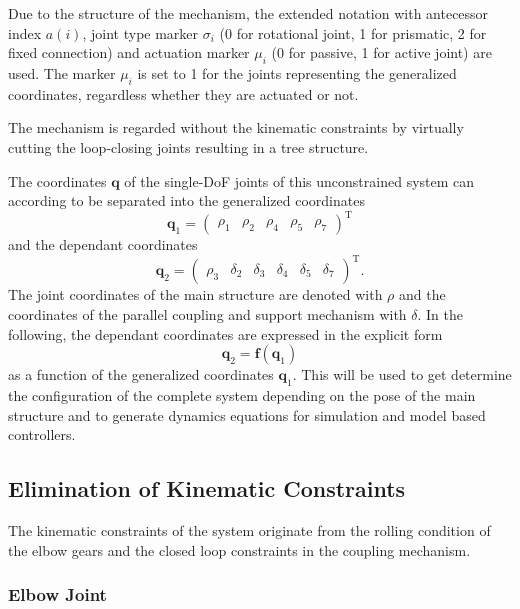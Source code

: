 \documentclass[letterpaper, 10 pt, conference]{ieeeconf}  %
\begin{document}
Due to the structure of the mechanism, the extended notation with antecessor index $a(i)$, joint type marker $\sigma_i$ (0 for rotational joint, 1 for prismatic, 2 for fixed connection) and actuation marker $\mu_i$ (0 for passive, 1 for active joint) are used.
The marker $\mu_i$ is set to 1 for the joints representing the generalized coordinates, regardless whether they are actuated or not.

The mechanism is regarded without the kinematic constraints by virtually cutting the loop-closing joints resulting in a tree structure.

The coordinates $\bm{q}$ of the single-DoF joints of this unconstrained system can according to \cite{NakamuraGho1989} be separated into the generalized coordinates
%
\begin{equation}
\bm{q}_1=\begin{pmatrix}\rho_1 & \rho_2 & \rho_4 & \rho_5 &\rho_7 \end{pmatrix}^\mathrm{T}
\end{equation}
%
and the dependant coordinates
%
\begin{equation}
\bm{q}_2=\begin{pmatrix}\rho_3 & \delta_2 & \delta_3 & \delta_4 & \delta_5 & \delta_7 \end{pmatrix}^\mathrm{T}.
\end{equation}
%
The joint coordinates of the main structure are denoted with $\rho$ and the coordinates of the parallel coupling and support mechanism with $\delta$.
%
In the following, the dependant coordinates are expressed in the explicit form
%
\begin{equation}
\bm{q}_2=\bm{f}(\bm{q}_1)
\end{equation}
%
as a function of the generalized coordinates $\bm{q}_1$.
This will be used to get determine the configuration of the complete system depending on the pose of the main structure and to generate dynamics equations for simulation and model based controllers.

\subsection{Elimination of Kinematic Constraints}

The kinematic constraints of the system originate from the rolling condition of the elbow gears and the closed loop constraints in the coupling mechanism.

\subsubsection{Elbow Joint}
\end{document}
